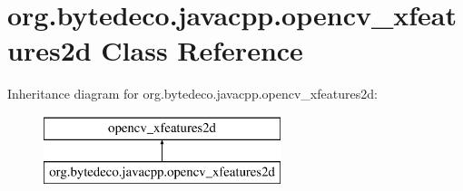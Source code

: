 \hypertarget{classorg_1_1bytedeco_1_1javacpp_1_1opencv__xfeatures2d}{}\section{org.\+bytedeco.\+javacpp.\+opencv\+\_\+xfeatures2d Class Reference}
\label{classorg_1_1bytedeco_1_1javacpp_1_1opencv__xfeatures2d}
Inheritance diagram for org.\+bytedeco.\+javacpp.\+opencv\+\_\+xfeatures2d\+:\begin{figure}[H]
\begin{center}
\leavevmode
\includegraphics[height=2.000000cm]{classorg_1_1bytedeco_1_1javacpp_1_1opencv__xfeatures2d}
\end{center}
\end{figure}
